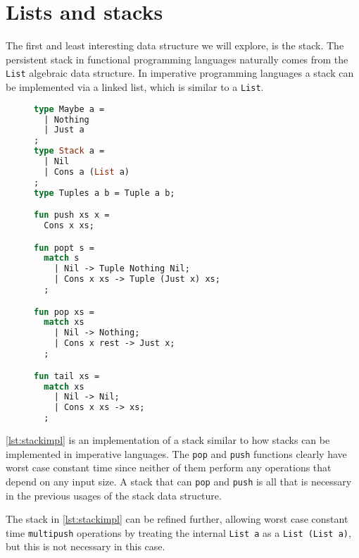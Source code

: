 \section{Lists and stacks}
The first and least interesting data structure we will explore, is the stack.
The persistent stack in functional programming languages naturally comes from the \texttt{List} algebraic data structure.
In imperative programming languages a stack can be implemented via a linked list, which is similar to a \texttt{List}.
\begin{figure}
\begin{lstlisting}[language=ML,caption={Stack implementation},label={lst:stackimpl},mathescape=true]
type Maybe a =
  | Nothing
  | Just a
;
type Stack a =
  | Nil
  | Cons a (List a)
;
type Tuples a b = Tuple a b;

fun push xs x = 
  Cons x xs;

fun popt s =
  match s
    | Nil -> Tuple Nothing Nil;
    | Cons x xs -> Tuple (Just x) xs;
  ;

fun pop xs =
  match xs
    | Nil -> Nothing;
    | Cons x rest -> Just x;
  ;

fun tail xs = 
  match xs
    | Nil -> Nil;
    | Cons x xs -> xs;
  ;
\end{lstlisting}
\end{figure}
\autoref{lst:stackimpl} is an implementation of a stack similar to how stacks can be implemented in imperative languages.
The \texttt{pop} and \texttt{push} functions clearly have worst case constant time since neither of them perform any operations that depend on any input size.
A stack that can \texttt{pop} and \texttt{push} is all that is necessary in the previous usages of the stack data structure.
\begin{remark}
  The stack in \autoref{lst:stackimpl} can be refined further, allowing worst case constant time \texttt{multipush} operations by treating the internal \texttt{List a} as a \texttt{List (List a)}, but this is not necessary in this case.
\end{remark}

